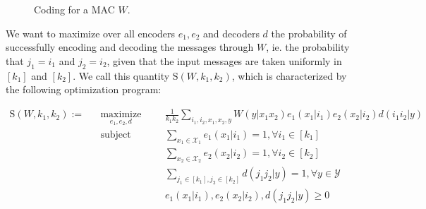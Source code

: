 \documentclass[11pt]{article}
\theoremstyle{definition}
\theoremstyle{remark}
\DeclareMathOperator{\maxi}{\text{maximize}}
\DeclareMathOperator{\st}{\text{subject to}}
\begin{document}
\begin{figure}[!h]
\begin{center}
\end{center}
\label{fig:MACcoding}
\caption{Coding for a MAC $W$.}
\end{figure}

We want to maximize over all encoders $e_1,e_2$ and decoders $d$ the probability of successfully encoding and decoding the messages through $W$, ie. the probability that $j_1 = i_1$ and  $j_2 = i_2$, given that the input messages are taken uniformly in $[k_1]$ and $[k_2]$. We call this quantity $\mathrm{S}(W,k_1,k_2)$, which is characterized by the following optimization program:

\begin{equation}
\label{eq:def-succ-prob-mac}
  \begin{aligned}
    \mathrm{S}(W,k_1,k_2) := &&\underset{e_1,e_2,d}{\maxi} &&& \frac{1}{k_1k_2} \sum_{i_1,i_2,x_1,x_2,y} W(y|x_1x_2)e_1(x_1|i_1)e_2(x_2|i_2)d(i_1i_2|y)\\
    &&\st &&& \sum_{x_1 \in \mathcal{X}_1} e_1(x_1|i_1) = 1, \forall i_1 \in [k_1]\\
    &&&&&  \sum_{x_2 \in \mathcal{X}_2} e_2(x_2|i_2) = 1, \forall i_2 \in [k_2]\\
    &&&&& \sum_{j_1 \in [k_1],j_2 \in [k_2]} d(j_1j_2|y) = 1, \forall y \in \mathcal{Y}\\
    &&&&& e_1(x_1|i_1), e_2(x_2|i_2), d(j_1j_2|y) \geq 0
  \end{aligned}
\end{equation}
\end{document}
